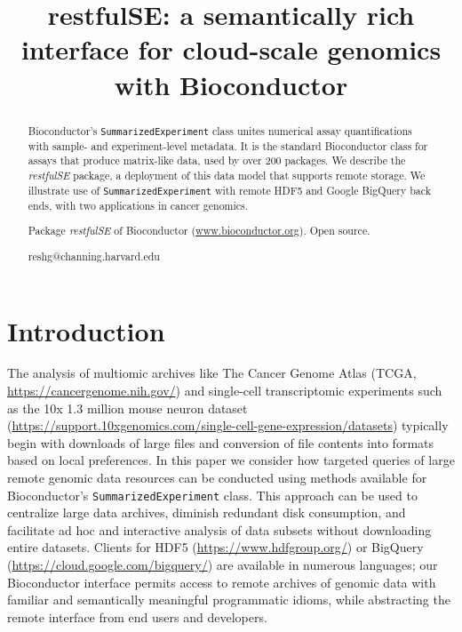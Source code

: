 \documentclass[applications]{gen-bioinformatics}
\author[1]{\pfnm{Shweta}
  \pinit{}
  \psnm{Gopaulakrishnan}}
\author[1]{\pfnm{Samuela}
  \pinit{}
  \psnm{Pollack}}
\author[1]{\pfnm{Benjamin}
  \pinit{}
  \psnm{Stubbs}}
\author[2]{\pfnm{Herv\'e}
  \pinit{}
  \psnm{Pag\`es}}
\author[3]{\pfnm{John}
  \pinit{}
  \psnm{Readey}}
\author[4]{\pfnm{Sean}
  \pinit{}
  \psnm{Davis}}
\author[5]{\pfnm{Levi}
  \pinit{}
  \psnm{Waldron}}
\author[6]{\pfnm{Martin}
  \pinit{T}
  \psnm{Morgan}}
\author[1]{\pfnm{Vincent}
  \pinit{J}
  \psnm{Carey}}
\newcommand{\Biocpackage}[1]{{\textit{#1}}}
\newcommand{\BiocpackageFirst}[1]{{\textit{#1}}}
\begin{document}
\title{restfulSE: a semantically rich interface for cloud-scale genomics
with Bioconductor}
\maketitle

\begin{abstract}
\begin{subabstract}[Summary]
Bioconductor's \texttt{SummarizedExperiment} class unites numerical
assay quantifications with sample- and experiment-level metadata.  
It is the standard Bioconductor class for assays that
produce matrix-like data, used by over 200 packages.
We describe the \Biocpackage{restfulSE} package, a deployment of 
this data model that supports
remote storage.
We illustrate use of
\texttt{SummarizedExperiment} with remote HDF5 and Google
BigQuery back ends, with two applications in cancer genomics.
\end{subabstract}
\begin{subabstract}[Availability] Package \BiocpackageFirst{restfulSE} of Bioconductor
 (\url {www.bioconductor.org}). Open source.
\end{subabstract}
\begin{subabstract}[Contact]reshg@channing.harvard.edu
\end{subabstract}
\end{abstract}
\section*{Introduction}

The analysis of multiomic archives like The Cancer Genome Atlas (TCGA, \url{https://cancergenome.nih.gov/})
and single-cell transcriptomic experiments such as the 10x 1.3 million
mouse neuron dataset (\url{https://support.10xgenomics.com/single-cell-gene-expression/datasets}) typically begin with downloads of large files and
conversion of file contents into formats based on local preferences.
In this paper we consider how targeted queries of large remote genomic
data resources can be conducted using methods available for
Bioconductor's \texttt{SummarizedExperiment} class.  This approach can
be used to centralize large data archives, diminish redundant disk
consumption, and facilitate ad hoc and interactive analysis of data
subsets without downloading entire datasets. Clients for
HDF5 (\url{https://www.hdfgroup.org/}) or BigQuery (\url{https://cloud.google.com/bigquery/}) are available in numerous languages; our
Bioconductor interface permits access to remote archives of genomic
data with familiar and semantically meaningful programmatic idioms,
while abstracting the remote interface from end users
and developers.
\end{document}

